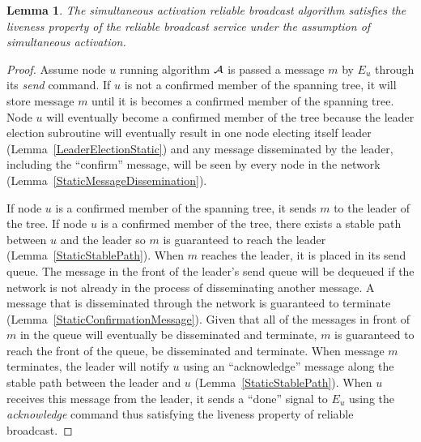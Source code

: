 \documentclass[english]{article}
\newtheorem{lemma}[theorem]{Lemma}
\begin{document}
\begin{lemma}
\label{StaticRBLiveness}
The simultaneous activation reliable broadcast algorithm satisfies the liveness property of the reliable broadcast service under the assumption of simultaneous activation.
\end{lemma}
\begin{proof}

Assume node $u$ running algorithm $\cal A$ is passed a message $m$ by $E_u$ through its \textit{send} command. If $u$ is not a confirmed member of the spanning tree, it will store message $m$ until it is becomes a confirmed member of the spanning tree. Node $u$ will eventually become a confirmed member of the tree because the leader election subroutine will eventually result in one node electing itself leader (Lemma~\ref{LeaderElectionStatic}) and any message disseminated by the leader, including the ``confirm'' message, will be seen by every node in the network (Lemma~\ref{StaticMessageDissemination}).

If node $u$ is a confirmed member of the spanning tree, it sends $m$ to the leader of the tree. If node $u$ is a confirmed member of the tree, there exists a stable path between $u$ and the leader so $m$ is guaranteed to reach the leader (Lemma~\ref{StaticStablePath}). When $m$ reaches the leader, it is placed in its send queue. The message in the front of the leader's send queue will be dequeued if the network is not already in the process of disseminating another message. A message that is disseminated through the network is guaranteed to terminate (Lemma~\ref{StaticConfirmationMessage}). Given that all of the messages in front of $m$ in the queue will eventually be disseminated and terminate, $m$ is guaranteed to reach the front of the queue, be disseminated and terminate. When message $m$ terminates, the leader will notify $u$ using an ``acknowledge'' message along the stable path between the leader and $u$ (Lemma~\ref{StaticStablePath}). When $u$ receives this message from the leader, it sends  a ``done'' signal to $E_u$ using the \textit{acknowledge} command thus satisfying the liveness property of reliable broadcast.

\end{proof}
\end{document}
